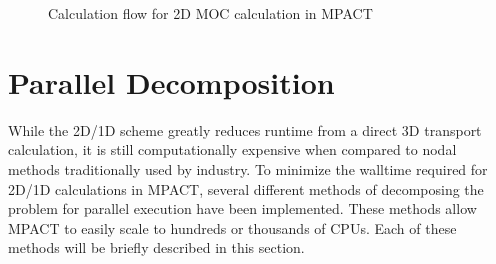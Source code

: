 \begin{figure}
  \centering
  
  \caption{Calculation flow for 2D MOC calculation in MPACT}\label{f:MOC-flowchart}
\end{figure}

\section{Parallel Decomposition}

While the 2D/1D scheme greatly reduces runtime from a direct 3D transport calculation, it is still computationally expensive when compared to nodal methods traditionally used by industry.  To minimize the walltime required for 2D/1D calculations in MPACT, several different methods of decomposing the problem for parallel execution have been implemented.  These methods allow MPACT to easily scale to hundreds or thousands of CPUs.  Each of these methods will be briefly described in this section.

